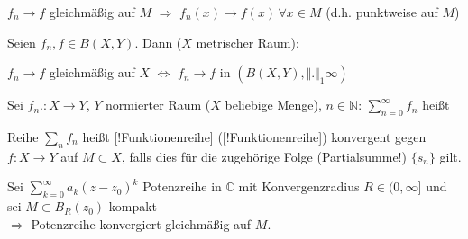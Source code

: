 \begin{lemma}
	$f_n\to f$ gleichmäßig auf $M$ $\Rightarrow$ $f_n(x)\to f(x)\,\forall x\in M$ (d.h. punktweise auf $M$)
\end{lemma}

\begin{proposition}
	Seien $f_n, f\in B(X,Y)$. Dann ($X$ metrischer Raum):
	\begin{center}
		$f_n \to f$ gleichmäßig auf $X$ $\Leftrightarrow$ $f_n \to f$ in $(B(X,Y),\Vert.\Vert_1\infty)$
	\end{center}
\end{proposition}

\begin{*definition}
	Sei $f_n.:X\to Y$, $Y$ normierter Raum ($X$ beliebige Menge), $n\in\mathbb{N}$: $\sum_{n=0}^\infty f_n$ heißt 
	
	Reihe $\sum_n f_n$ heißt [!Funktionenreihe] ([!Funktionenreihe]) konvergent gegen $f:X\to Y$ auf $M\subset X$, falls dies für die zugehörige Folge (Partialsumme!) $\{s_n\}$ gilt.
\end{*definition}

\begin{proposition}
	Sei $\sum_{k=0}^\infty a_k(z-z_0)^k$ Potenzreihe in $\mathbb{C}$ mit Konvergenzradius $R\in(0,\infty]$ und sei $M\subset B_R(z_0)$ kompakt\\
	$\Rightarrow$ Potenzreihe konvergiert gleichmäßig auf $M$.
\end{proposition}
